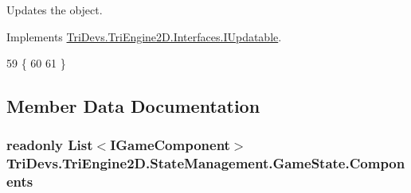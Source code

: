 Updates the object. 



Implements \hyperlink{interface_tri_devs_1_1_tri_engine2_d_1_1_interfaces_1_1_i_updatable_a01e54ce26f078bffd4434aca86e2a7e4}{Tri\-Devs.\-Tri\-Engine2\-D.\-Interfaces.\-I\-Updatable}.


\begin{DoxyCode}
59         \{
60             
61         \}
\end{DoxyCode}


\subsection{Member Data Documentation}
\hypertarget{class_tri_devs_1_1_tri_engine2_d_1_1_state_management_1_1_game_state_ab1ea74d5e4192c58474a485bf162fd67}{
\subsubsection[{Components}]{\setlength{\rightskip}{0pt plus 5cm}readonly List$<${\bf I\-Game\-Component}$>$ Tri\-Devs.\-Tri\-Engine2\-D.\-State\-Management.\-Game\-State.\-Components\hspace{0.3cm}{\ttfamily [protected]}}}\label{class_tri_devs_1_1_tri_engine2_d_1_1_state_management_1_1_game_state_ab1ea74d5e4192c58474a485bf162fd67}


